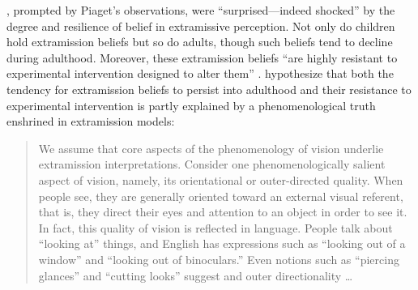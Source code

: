 \citet[138]{Winer:1996as}, prompted by Piaget's observations, were ``sur\-pri\-sed---indeed shocked'' by the degree and resilience of belief in extramissive perception. Not only do children hold extramission beliefs but so do adults, though such beliefs tend to decline during adulthood. Moreover, these extramission beliefs ``are highly resistant to experimental intervention designed to alter them'' \citep[138]{Winer:1996as}. \citet{Winer:1996as} hypothesize that both the tendency for extramission beliefs to persist into adulthood and their resistance to experimental intervention is partly explained by a phenomenological truth enshrined in extramission models:
\begin{quote}
	We assume that core aspects of the phenomenology of vision underlie extramission interpretations. Consider one phenomenologically salient aspect of vision, namely, its orientational or outer-directed quality. When people see, they are generally oriented toward an external visual referent, that is, they direct their eyes and attention to an object in order to see it. In fact, this quality of vision is reflected in language. People talk about ``looking at'' things, and English has expressions such as ``looking out of a window'' and ``looking out of binoculars.'' Even notions such as ``piercing glances'' and ``cutting looks'' suggest and outer directionality \ldots\ \citep[140]{Winer:1996as}
\end{quote}



